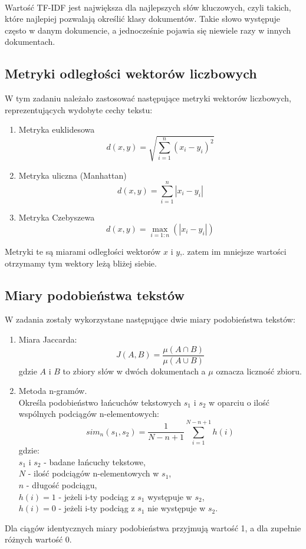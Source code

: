\documentclass{classrep}
\begin{document}
\paragraph{}
Wartość TF-IDF jest największa dla najlepszych słów kluczowych, czyli takich, które najlepiej pozwalają określić klasy dokumentów. Takie słowo występuje często w danym dokumencie, a jednocześnie pojawia się niewiele razy w innych dokumentach.


\subsection{Metryki odległości wektorów liczbowych}
W tym zadaniu należało zastosować następujące metryki wektorów liczbowych, reprezentujących wydobyte cechy tekstu:

\begin{enumerate}
\item Metryka euklidesowa $$d(x,y)=\sqrt{\sum_{i=1}^{n}{(x_i-y_i)^2} } $$
\item Metryka uliczna (Manhattan) $$d(x,y)=\sum_{i=1}^{n}{|x_i-y_i|} $$
\item Metryka Czebyszewa $$d(x,y)=\max_{i=1:n}(|x_i-y_i|) $$
\end{enumerate}
Metryki te są miarami odległości wektorów $x$ i $y$,. zatem im mniejsze wartości otrzymamy tym wektory leżą bliżej siebie.

\subsection{Miary podobieństwa tekstów}
W zadania zostały wykorzystane następujące dwie miary podobieństwa tekstów:

\begin{enumerate}
\item Miara Jaccarda: $$J(A,B)=\frac{\mu(A \cap B)}{\mu(A \cup B)}$$
gdzie $A$ i $B$ to zbiory słów w dwóch dokumentach a $\mu$ oznacza liczność zbioru.

\item Metoda n-gramów.\\
Określa podobieństwo łańcuchów tekstowych $s_1$ i $s_2$ w oparciu o ilość wspólnych podciągów n-elementowych:
$$sim_n(s_1, s_2)=\frac{1}{N-n+1}\sum_{i=1}^{N-n+1}h(i)$$
gdzie:\\
 $s_1$ i $s_2$ - badane łańcuchy tekstowe,\\
 $N$ - ilość podciągów n-elementowych w $s_1$,\\
 $n$ - długość podciągu,\\
 $h(i)=1$ - jeżeli i-ty podciąg z $s_1$ występuje w $s_2$,\\
 $h(i)=0$ - jeżeli i-ty podciąg z $s_1$ nie występuje w $s_2$.
\end{enumerate}
Dla ciągów identycznych miary podobieństwa przyjmują wartość 1, a dla zupełnie różnych wartość 0.
\end{document}
